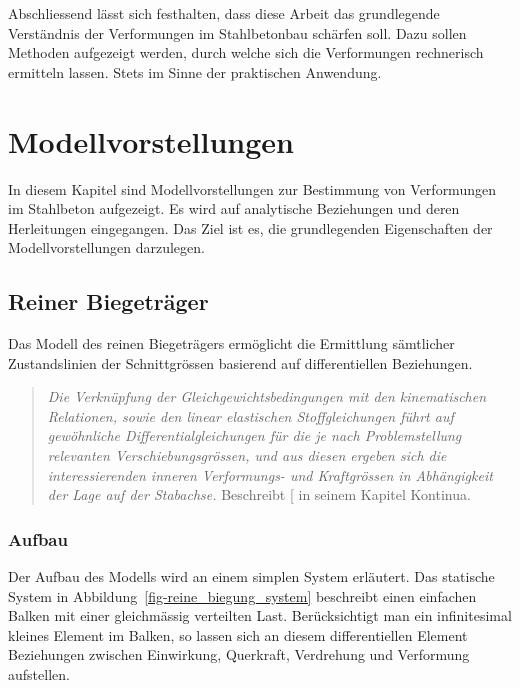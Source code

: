 \documentclass[
  12pt,
  letterpaper,
  egregdoesnotlikesansseriftitles]{scrreprt}
\begin{document}
Abschliessend lässt sich festhalten, dass diese Arbeit das grundlegende
Verständnis der Verformungen im Stahlbetonbau schärfen soll. Dazu sollen
Methoden aufgezeigt werden, durch welche sich die Verformungen
rechnerisch ermitteln lassen. Stets im Sinne der praktischen Anwendung.


\chapter{Modellvorstellungen}\label{sec-modellbeschrieb}

In diesem Kapitel sind Modellvorstellungen zur Bestimmung von
Verformungen im Stahlbeton aufgezeigt. Es wird auf analytische
Beziehungen und deren Herleitungen eingegangen. Das Ziel ist es, die
grundlegenden Eigenschaften der Modellvorstellungen darzulegen.

\section{Reiner Biegeträger}\label{sec-kontinua}

Das Modell des reinen Biegeträgers ermöglicht die Ermittlung sämtlicher
Zustandslinien der Schnittgrössen basierend auf differentiellen
Beziehungen.

\begin{quote}
\emph{Die Verknüpfung der Gleichgewichtsbedingungen mit den
kinematischen Relationen, sowie den linear elastischen Stoffgleichungen
führt auf gewöhnliche Differentialgleichungen für die je nach
Problemstellung relevanten Verschiebungsgrössen, und aus diesen ergeben
sich die interessierenden inneren Verformungs- und Kraftgrössen in
Abhängigkeit der Lage auf der Stabachse.} Beschreibt
{[}\citeproc{ref-Marti}{3}{]} in seinem Kapitel Kontinua.
\end{quote}

\subsection{Aufbau}\label{aufbau}

Der Aufbau des Modells wird an einem simplen System erläutert. Das
statische System in Abbildung~\ref{fig-reine_biegung_system} beschreibt
einen einfachen Balken mit einer gleichmässig verteilten Last.
Berücksichtigt man ein infinitesimal kleines Element im Balken, so
lassen sich an diesem differentiellen Element Beziehungen zwischen
Einwirkung, Querkraft, Verdrehung und Verformung aufstellen.
\end{document}
